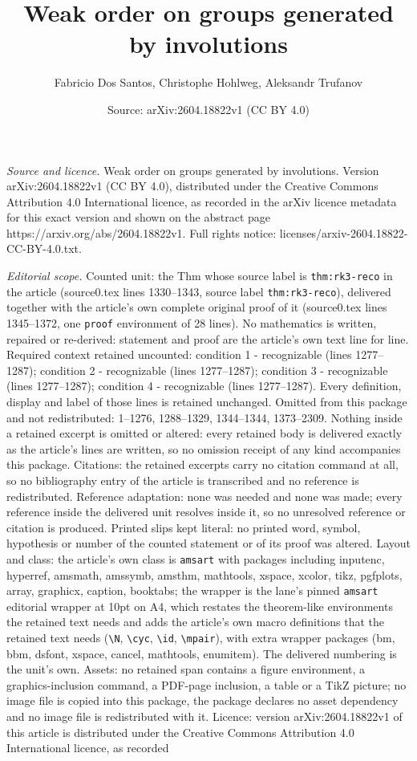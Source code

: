 \documentclass[10pt,a4paper]{amsart}
\title[Weak order on groups generated by involutions]{Weak order on groups generated by involutions}
\author{Fabricio Dos Santos, Christophe Hohlweg, Aleksandr Trufanov}
\date{Source: arXiv:2604.18822v1 (CC BY 4.0)}
\begin{document}
\maketitle

\noindent\emph{Source and licence.} Weak order on groups generated by involutions. Version arXiv:2604.18822v1 (CC BY 4.0), distributed under the Creative Commons Attribution 4.0 International licence, as recorded in the arXiv licence metadata for this exact version and shown on the abstract page https://arxiv.org/abs/2604.18822v1. Full rights notice: licenses/arxiv-2604.18822-CC-BY-4.0.txt.\par\smallskip

\noindent\textit{Editorial scope.} Counted unit: the Thm whose source label is \texttt{thm:rk3-reco} in the article (source0.tex lines 1330--1343, source label \texttt{thm:rk3-reco}), delivered together with the article's own complete original proof of it (source0.tex lines 1345--1372, one \texttt{proof} environment of 28 lines). No mathematics is written, repaired or re-derived: statement and proof are the article's own text line for line. Required context retained uncounted: condition 1 - recognizable (lines 1277--1287); condition 2 - recognizable (lines 1277--1287); condition 3 - recognizable (lines 1277--1287); condition 4 - recognizable (lines 1277--1287). Every definition, display and label of those lines is retained unchanged. Omitted from this package and not redistributed: 1--1276, 1288--1329, 1344--1344, 1373--2309. Nothing inside a retained excerpt is omitted or altered: every retained body is delivered exactly as the article's lines are written, so no omission receipt of any kind accompanies this package. Citations: the retained excerpts carry no citation command at all, so no bibliography entry of the article is transcribed and no reference is redistributed. Reference adaptation: none was needed and none was made; every reference inside the delivered unit resolves inside it, so no unresolved reference or citation is produced. Printed slips kept literal: no printed word, symbol, hypothesis or number of the counted statement or of its proof was altered. Layout and class: the article's own class is \texttt{amsart} with packages including inputenc, hyperref, amsmath, amssymb, amsthm, mathtools, xspace, xcolor, tikz, pgfplots, array, graphicx, caption, booktabs; the wrapper is the lane's pinned \texttt{amsart} editorial wrapper at 10pt on A4, which restates the theorem-like environments the retained text needs and adds the article's own macro definitions that the retained text needs (\texttt{\textbackslash N}, \texttt{\textbackslash cyc}, \texttt{\textbackslash id}, \texttt{\textbackslash mpair}), with extra wrapper packages (bm, bbm, dsfont, xspace, cancel, mathtools, enumitem). The delivered numbering is the unit's own. Assets: no retained span contains a figure environment, a graphics-inclusion command, a PDF-page inclusion, a table or a TikZ picture; no image file is copied into this package, the package declares no asset dependency and no image file is redistributed with it. Licence: version arXiv:2604.18822v1 of this article is distributed under the Creative Commons Attribution 4.0 International licence, as recorded 
\end{document}
